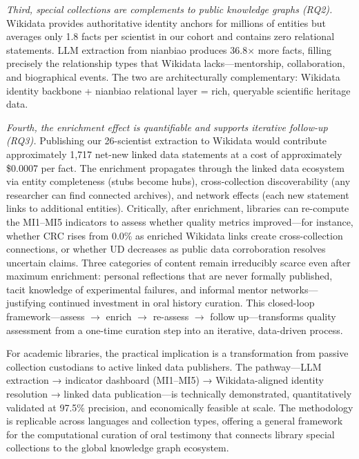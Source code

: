 \documentclass[review]{elsarticle}
\begin{document}
\textit{Third, special collections are complements to public knowledge graphs (RQ2).} Wikidata provides authoritative identity anchors for millions of entities but averages only 1.8 facts per scientist in our cohort and contains zero relational statements. LLM extraction from nianbiao produces 36.8$\times$ more facts, filling precisely the relationship types that Wikidata lacks—mentorship, collaboration, and biographical events. The two are architecturally complementary: Wikidata identity backbone + nianbiao relational layer = rich, queryable scientific heritage data.

\textit{Fourth, the enrichment effect is quantifiable and supports iterative follow-up (RQ3).} Publishing our 26-scientist extraction to Wikidata would contribute approximately 1,717 net-new linked data statements at a cost of approximately \$0.0007 per fact. The enrichment propagates through the linked data ecosystem via entity completeness (stubs become hubs), cross-collection discoverability (any researcher can find connected archives), and network effects (each new statement links to additional entities). Critically, after enrichment, libraries can re-compute the MI1--MI5 indicators to assess whether quality metrics improved—for instance, whether CRC rises from 0.0\% as enriched Wikidata links create cross-collection connections, or whether UD decreases as public data corroboration resolves uncertain claims. Three categories of content remain irreducibly scarce even after maximum enrichment: personal reflections that are never formally published, tacit knowledge of experimental failures, and informal mentor networks—justifying continued investment in oral history curation. This closed-loop framework—assess $\rightarrow$ enrich $\rightarrow$ re-assess $\rightarrow$ follow up—transforms quality assessment from a one-time curation step into an iterative, data-driven process.

For academic libraries, the practical implication is a transformation from passive collection custodians to active linked data publishers. The pathway—LLM extraction → indicator dashboard (MI1--MI5) → Wikidata-aligned identity resolution → linked data publication—is technically demonstrated, quantitatively validated at 97.5\% precision, and economically feasible at scale. The methodology is replicable across languages and collection types, offering a general framework for the computational curation of oral testimony that connects library special collections to the global knowledge graph ecosystem.
\end{document}
